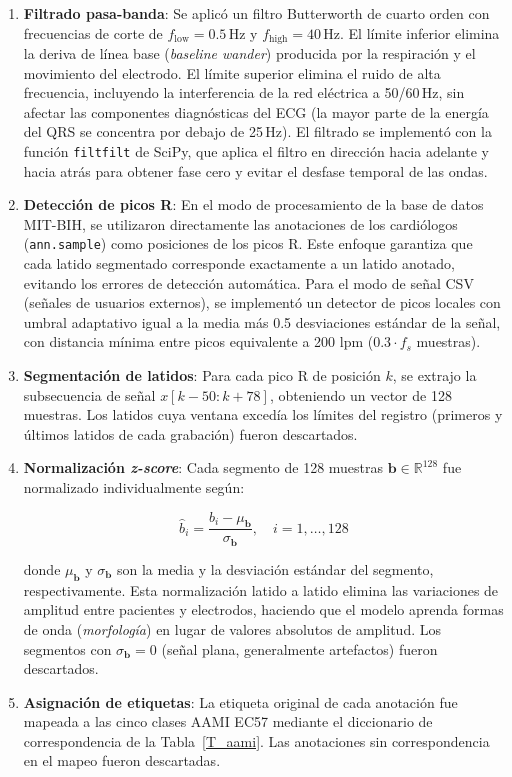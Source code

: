 \begin{enumerate}

\item \textbf{Filtrado pasa-banda}: Se aplicó un filtro Butterworth de cuarto orden con frecuencias de corte de $f_\text{low} = 0.5$\,Hz y $f_\text{high} = 40$\,Hz. El límite inferior elimina la deriva de línea base (\textit{baseline wander}) producida por la respiración y el movimiento del electrodo. El límite superior elimina el ruido de alta frecuencia, incluyendo la interferencia de la red eléctrica a 50/60\,Hz, sin afectar las componentes diagnósticas del ECG (la mayor parte de la energía del QRS se concentra por debajo de 25\,Hz). El filtrado se implementó con la función \texttt{filtfilt} de SciPy, que aplica el filtro en dirección hacia adelante y hacia atrás para obtener fase cero y evitar el desfase temporal de las ondas.

\item \textbf{Detección de picos R}: En el modo de procesamiento de la base de datos MIT-BIH, se utilizaron directamente las anotaciones de los cardiólogos (\texttt{ann.sample}) como posiciones de los picos R. Este enfoque garantiza que cada latido segmentado corresponde exactamente a un latido anotado, evitando los errores de detección automática. Para el modo de señal CSV (señales de usuarios externos), se implementó un detector de picos locales con umbral adaptativo igual a la media más 0.5 desviaciones estándar de la señal, con distancia mínima entre picos equivalente a 200 lpm ($0.3 \cdot f_s$ muestras).

\item \textbf{Segmentación de latidos}: Para cada pico R de posición $k$, se extrajo la subsecuencia de señal $x[k - 50 : k + 78]$, obteniendo un vector de 128 muestras. Los latidos cuya ventana excedía los límites del registro (primeros y últimos latidos de cada grabación) fueron descartados.

\item \textbf{Normalización \textit{z-score}}: Cada segmento de 128 muestras $\mathbf{b} \in \mathbb{R}^{128}$ fue normalizado individualmente según:

\begin{equation}
\hat{b}_i = \frac{b_i - \mu_\mathbf{b}}{\sigma_\mathbf{b}}, \quad i = 1, \ldots, 128
\label{eq:zscore}
\end{equation}

donde $\mu_\mathbf{b}$ y $\sigma_\mathbf{b}$ son la media y la desviación estándar del segmento, respectivamente. Esta normalización latido a latido elimina las variaciones de amplitud entre pacientes y electrodos, haciendo que el modelo aprenda formas de onda (\textit{morfología}) en lugar de valores absolutos de amplitud. Los segmentos con $\sigma_\mathbf{b} = 0$ (señal plana, generalmente artefactos) fueron descartados.

\item \textbf{Asignación de etiquetas}: La etiqueta original de cada anotación fue mapeada a las cinco clases AAMI EC57 mediante el diccionario de correspondencia de la Tabla~\ref{T_aami}. Las anotaciones sin correspondencia en el mapeo fueron descartadas.

\end{enumerate}

